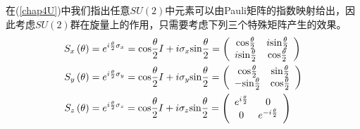 在(\ref{chap4U})中我们指出任意$SU(2)$中元素可以由Pauli矩阵的指数映射给出，因此考虑$SU(2)$群在旋量上的作用，只需要考虑下列三个特殊矩阵产生的效果。
\begin{equation}
    \begin{aligned}
        S_{x}\left(\theta\right)&=e^{i\frac{\theta}{2}\sigma_{x}}={\rm cos}\frac{\theta}{2}I+i\sigma_{x}{\rm sin}\frac{\theta}{2}=\left(\begin{array}{cc}
           {\rm cos}\frac{\theta}{2}  & i{\rm sin}\frac{\theta}{2} \\
            i{\rm sin}\frac{\theta}{2} & {\rm cos}\frac{\theta}{2}
        \end{array}\right)\\
         S_{y}\left(\theta\right)&=e^{i\frac{\theta}{2}\sigma_{y}}={\rm cos}\frac{\theta}{2}I+i\sigma_{y}{\rm sin}\frac{\theta}{2}=\left(\begin{array}{cc}
           {\rm cos}\frac{\theta}{2}  & {\rm sin}\frac{\theta}{2} \\
            -{\rm sin}\frac{\theta}{2} & {\rm cos}\frac{\theta}{2}
        \end{array}\right)\\
         S_{z}\left(\theta\right)&=e^{i\frac{\theta}{2}\sigma_{z}}={\rm cos}\frac{\theta}{2}I+i\sigma_{z}{\rm sin}\frac{\theta}{2}=\left(\begin{array}{cc}
           e^{i\frac{\theta}{2}}  & 0 \\
           0 & e^{-i\frac{\theta}{2}} 
        \end{array}\right)\\
    \end{aligned}
\end{equation}

